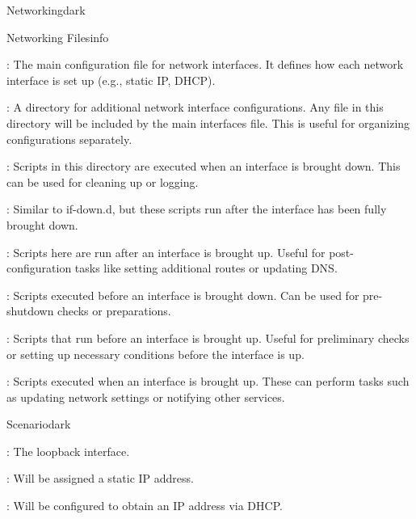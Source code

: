 \label{Networking}
\begin{baseBoxThree}{Networking}{dark}

    \label{Networking Files}
    \begin{baseBoxThree}{Networking Files}{info}
        \begin{posnexItemize}
            \item[\sA] : The main configuration file for network interfaces. It defines how each network interface is set up (e.g., static IP, DHCP).
            \item[\sA] : A directory for additional network interface configurations. Any file in this directory will be included by the main interfaces file. This is useful for organizing configurations separately. 
            \item[\sA] : Scripts in this directory are executed when an interface is brought down. This can be used for cleaning up or logging. 
            \item[\sA] : Similar to if-down.d, but these scripts run after the interface has been fully brought down. 
            \item[\sA] : Scripts here are run after an interface is brought up. Useful for post-configuration tasks like setting additional routes or updating DNS.
            \item[\sA] : Scripts executed before an interface is brought down. Can be used for pre-shutdown checks or preparations.
            \item[\sA] : Scripts that run before an interface is brought up. Useful for preliminary checks or setting up necessary conditions before the interface is up.
            \item[\sA] : Scripts executed when an interface is brought up. These can perform tasks such as updating network settings or notifying other services.
        \end{posnexItemize}
    \end{baseBoxThree}
    \smallskip
    \label{Scripts in Action}
    \begin{baseBoxThree}{Scenario}{dark}
        \begin{posnexItemize}
            \item[\sA] : The loopback interface.
            \item[\sA] : Will be assigned a static IP address.
            \item[\sA] : Will be configured to obtain an IP address via DHCP.
        \end{posnexItemize}        
    \end{baseBoxThree}
\end{baseBoxThree}

